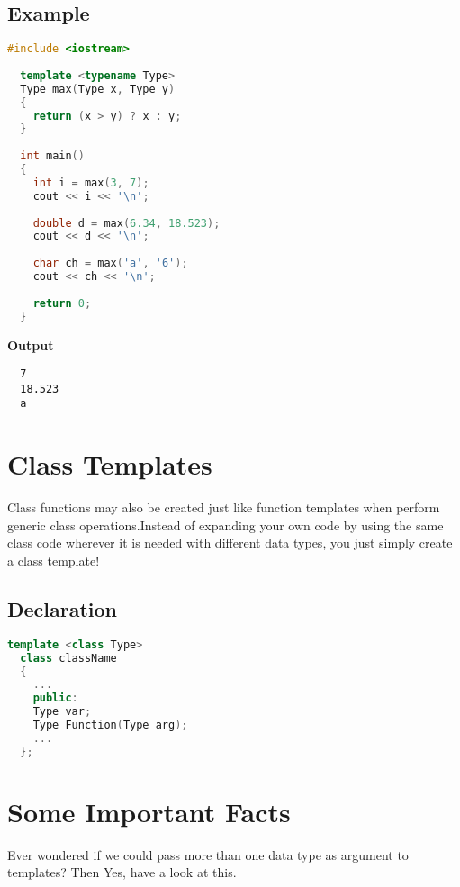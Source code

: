 \documentclass[11pt,fleqn]{book} %
\begin{document}
\subsection{Example}

\begin{lstlisting}[language=C++, caption= Eg:Function Template to output the greater number
  ]
  #include <iostream>
  
  template <typename Type>
  Type max(Type x, Type y)
  {
    return (x > y) ? x : y;
  }
  
  int main()
  {
    int i = max(3, 7);
    cout << i << '\n';
    
    double d = max(6.34, 18.523);
    cout << d << '\n';
    
    char ch = max('a', '6');
    cout << ch << '\n';
    
    return 0;
  }
\end{lstlisting}
\textbf{Output}
\begin{lstlisting}
  7
  18.523
  a
\end{lstlisting}

\section{Class Templates}
Class functions may also be created just like function templates when perform generic class operations.Instead of expanding your own code by using the same class code wherever it is needed with different data types, you just simply create a class template!

\subsection{Declaration}
\begin{lstlisting}[language=C++, caption= Declaration Of Class Templates]
  template <class Type>
  class className
  {
    ...
    public:
    Type var;
    Type Function(Type arg);
    ... 
  };
\end{lstlisting}

\section{Some Important Facts}

Ever wondered if we could pass more than one data type as argument to templates? Then Yes, have a look at this.
\end{document}
